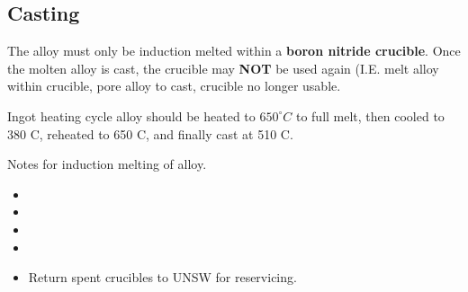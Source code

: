 \subsection{Casting}

The \MgZnCa alloy must only be induction melted within a \textbf{boron nitride crucible}. Once the molten alloy is cast, the crucible may \textbf{NOT} be used again (I.E. melt alloy within crucible, pore alloy to cast, crucible no longer usable. 

Ingot heating cycle
\MgZnCa alloy should be heated to $650^{\circ}C$ to full melt, then cooled to 380 C, reheated to 650 C, and finally cast at 510 C. 

Notes for induction melting of \MgZnCa alloy.
\begin{itemize}
\item 
\item 
\item 
\item
\item Return spent crucibles to UNSW for reservicing. 
\end{itemize}